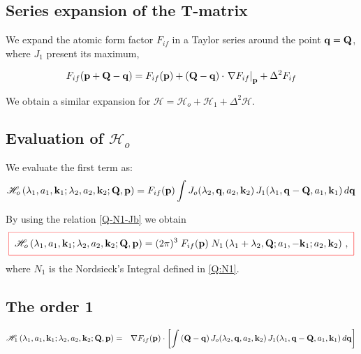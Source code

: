\subsection{Series expansion of the T-matrix}

We expand the atomic form factor $F_{if}$ in a Taylor series around the
point $\mathbf{q}= \mathbf{Q}$, where $J_{1}$ present its maximum,

\begin{equation}\label{QTaylorFif}
F_{if}(\mathbf{p} + \mathbf{Q} - \mathbf{q}) = F_{if}(\mathbf{p}) + \left( \mathbf{Q} -
\mathbf{q} \right) \cdot \left. \nabla F_{if} \right| _{\mathbf{p}} +
\Delta^{2} F_{if}
\end{equation}

We obtain a similar expansion for $\mathcal{H} = \mathcal{H}_{o} +
\mathcal{H}_{1} + \Delta^{2} \mathcal{H}$.

\subsection*{Evaluation of $\mathcal{H}_{o}$}
We evaluate the first term as:
%
\begin{equation}\label{Q:mathc-lambd-a_1-1}
 \mathcal{H}_{o}\left( \lambda_{1},a_{1},\mathbf{k}_{1} ;
\lambda_{2},a_{2},\mathbf{k}_{2}; \mathbf{Q}, \mathbf{p} \right) = F_{if}(\mathbf{p})
\int J_{o}(\lambda_{2},\mathbf{q},a_{2},\mathbf{k}_{2}) \, J_{1}(\lambda_{1},
\mathbf{q}- \mathbf{Q} ,a_{1},\mathbf{k}_{1} ) \, d \mathbf{q}
\end{equation}

By using the relation \ref{Q-N1-Jb} we obtain
\begin{equation}\label{Q:fbeq-mathcalh_o}
  \fbeq{
\mathcal{H}_{o} \left( \lambda_{1},a_{1},\vect{k}_{1} ; \lambda_{2},
a_{2}, \vect{k}_{2} ; \vect{Q}, \vect{p} \right) = (2 \pi)^{3} \;
F_{if}(\vect{p}) \; N_{1} \left(\lambda_{1}+\lambda_{2}, \vect{Q} ; a_{1},
- \vect{k}_{1} ; a_{2}, \vect{k}_{2} \right) \, ,
  }
\end{equation}
%
where $N_{1}$ is the Nordsieck's Integral defined in \ref{Q:N1}.

\subsection*{The order 1}
%
\begin{eqnarray}\label{Q:order1}
 \mathcal{H}_{1}\left( \lambda_{1},a_{1},\mathbf{k}_{1} ;
\lambda_{2}, a_{2}, \mathbf{k}_{2}; \mathbf{Q}, \mathbf{p} \right) &=&  \nabla
F_{if} ({\mathbf{p}}) \cdot  \left[ \int \left( \mathbf{Q} - \mathbf{q} \right)
J_{o}(\lambda_{2},\mathbf{q},a_{2},\mathbf{k}_{2}) \,  J_{1}(\lambda_{1},
\mathbf{q}- \mathbf{Q} ,a_{1},\mathbf{k}_{1} ) \, d \mathbf{q} \right]
\end{eqnarray}

